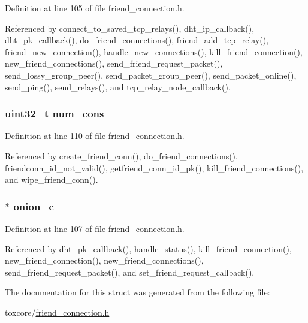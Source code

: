 Definition at line 105 of file friend\+\_\+connection.\+h.



Referenced by connect\+\_\+to\+\_\+saved\+\_\+tcp\+\_\+relays(), dht\+\_\+ip\+\_\+callback(), dht\+\_\+pk\+\_\+callback(), do\+\_\+friend\+\_\+connections(), friend\+\_\+add\+\_\+tcp\+\_\+relay(), friend\+\_\+new\+\_\+connection(), handle\+\_\+new\+\_\+connections(), kill\+\_\+friend\+\_\+connection(), new\+\_\+friend\+\_\+connections(), send\+\_\+friend\+\_\+request\+\_\+packet(), send\+\_\+lossy\+\_\+group\+\_\+peer(), send\+\_\+packet\+\_\+group\+\_\+peer(), send\+\_\+packet\+\_\+online(), send\+\_\+ping(), send\+\_\+relays(), and tcp\+\_\+relay\+\_\+node\+\_\+callback().

\hypertarget{struct_friend___connections_a81ac77652d6cc5071baca915581c5dfa}{
\subsubsection[{num\+\_\+cons}]{\setlength{\rightskip}{0pt plus 5cm}uint32\+\_\+t num\+\_\+cons}}\label{struct_friend___connections_a81ac77652d6cc5071baca915581c5dfa}


Definition at line 110 of file friend\+\_\+connection.\+h.



Referenced by create\+\_\+friend\+\_\+conn(), do\+\_\+friend\+\_\+connections(), friendconn\+\_\+id\+\_\+not\+\_\+valid(), getfriend\+\_\+conn\+\_\+id\+\_\+pk(), kill\+\_\+friend\+\_\+connections(), and wipe\+\_\+friend\+\_\+conn().

\hypertarget{struct_friend___connections_ae202b81f9a2c2fa80fd310a0996795fc}{
\subsubsection[{onion\+\_\+c}]{$\ast$ onion\+\_\+c}}\label{struct_friend___connections_ae202b81f9a2c2fa80fd310a0996795fc}


Definition at line 107 of file friend\+\_\+connection.\+h.



Referenced by dht\+\_\+pk\+\_\+callback(), handle\+\_\+status(), kill\+\_\+friend\+\_\+connection(), new\+\_\+friend\+\_\+connection(), new\+\_\+friend\+\_\+connections(), send\+\_\+friend\+\_\+request\+\_\+packet(), and set\+\_\+friend\+\_\+request\+\_\+callback().



The documentation for this struct was generated from the following file\+:\begin{DoxyCompactItemize}
\item 
toxcore/\hyperlink{friend__connection_8h}{friend\+\_\+connection.\+h}\end{DoxyCompactItemize}
